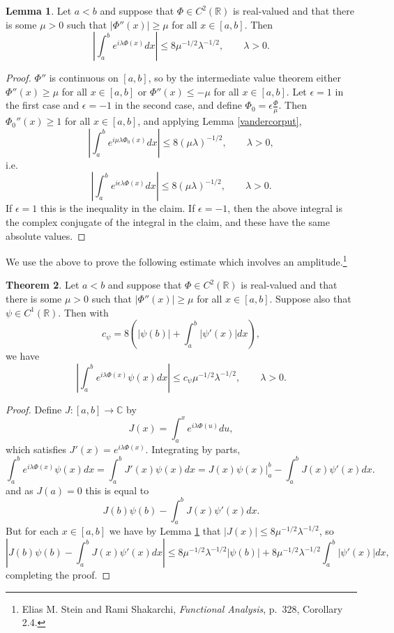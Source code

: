 \documentclass{article}
\theoremstyle{definition}
\newtheorem{theorem}{Theorem}
\newtheorem{lemma}[theorem]{Lemma}
\theoremstyle{definition}
\begin{document}
\begin{lemma}
Let $a<b$ and suppose that $\Phi \in C^2(\mathbb{R})$ is real-valued and that there is some $\mu>0$ such that
$|\Phi''(x)| \geq \mu$ for all $x \in [a,b]$.  Then
\[
\left| \int_a^b e^{i\lambda \Phi(x)} dx\right|  \leq 8\mu^{-1/2}   \lambda^{-1/2}, \qquad \lambda>0.
\]
\label{vandercorputmu}
\end{lemma}
\begin{proof}
$\Phi''$ is continuous on $[a,b]$, so by the intermediate value theorem  either $\Phi''(x) \geq \mu$ for all  $x \in [a,b]$ or $\Phi''(x) \leq -\mu$ for all  $x\in [a,b]$. 
Let $\epsilon=1$ in the first case and $\epsilon=-1$ in the second case, and define $\Phi_0=\epsilon \frac{\Phi}{\mu}$. 
Then $\Phi_0''(x) \geq 1$ for all $x \in [a,b]$, and
applying Lemma \ref{vandercorput},
\[
\left| \int_a^b e^{i \mu \lambda \Phi_0(x)} dx \right| \leq 8 (\mu \lambda)^{-1/2}, \qquad \lambda>0,
\]
i.e.
\[
\left| \int_a^b e^{i\epsilon \lambda \Phi(x)} dx \right| \leq 8(\mu \lambda)^{-1/2}, \qquad \lambda>0.
\]
If $\epsilon=1$ this is the inequality in the claim. If $\epsilon=-1$, then the above integral is the complex conjugate of the integral in the claim, and these have the same
absolute values.
\end{proof}


We use the above  to prove the following estimate which involves an amplitude.\footnote{Elias M. Stein and Rami Shakarchi, {\em Functional Analysis}, p.~328, Corollary 2.4.}

\begin{theorem}
Let $a<b$ and suppose that $\Phi \in C^2(\mathbb{R})$ is real-valued and that there is some $\mu>0$ such that
 $|\Phi''(x)| \geq \mu$ for all $x \in [a,b]$.
Suppose also that $\psi \in C^1(\mathbb{R})$. 
  Then
  with
\[
c_\psi = 8\left(|\psi(b)|+\int_a^b |\psi'(x)| dx\right),
\]
we have
\[
\left| \int_a^b e^{i\lambda \Phi(x)} \psi(x) dx \right| \leq c_\psi \mu^{-1/2} \lambda^{-1/2}, \qquad \lambda>0.
\]
\label{squarerootamplitude}
\end{theorem}
\begin{proof}
Define $J:[a,b] \to \mathbb{C}$ by 
\[
J(x) = \int_a^x e^{i\lambda \Phi(u)} du,
\]
which satisfies $J'(x)=e^{i\lambda \Phi(x)}$.
Integrating by parts,
\[
\int_a^b e^{i\lambda \Phi(x)} \psi(x) dx = \int_a^b J'(x) \psi(x) dx =
J(x)\psi(x) \bigg|_a^b -\int_a^b J(x) \psi'(x) dx.
\]
and as $J(a)=0$ this is equal to
\[
J(b)\psi(b)-\int_a^b J(x) \psi'(x) dx.
\]
But for each $x \in [a,b]$ we have by Lemma \ref{vandercorputmu} that $|J(x)| \leq 8\mu^{-1/2} \lambda^{-1/2}$, so 
\[
\left| J(b)\psi(b)-\int_a^b J(x) \psi'(x) dx \right|
\leq 8\mu^{-1/2}\lambda^{-1/2} |\psi(b)| + 8\mu^{-1/2}\lambda^{-1/2} \int_a^b |\psi'(x)| dx,
\]
completing the proof.
\end{proof}
\end{document}
